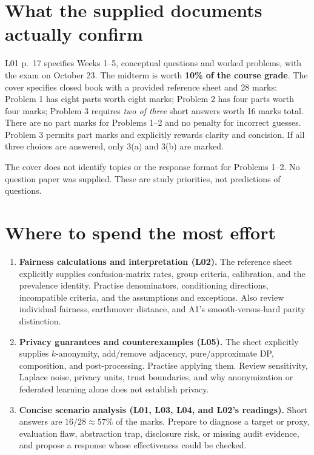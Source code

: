 \documentclass[11pt,letterpaper]{article}
\begin{document}

\section*{What the supplied documents actually confirm}
L01 p.~17 specifies Weeks 1--5, conceptual questions and worked problems, with
the exam on October 23. The midterm is worth \textbf{10\% of the course grade}.
The cover specifies closed book with a provided reference sheet and 28 marks:
Problem 1 has eight parts worth eight marks; Problem 2 has four parts worth four
marks; Problem 3 requires \emph{two of three} short answers worth 16 marks total.
There are no part marks for Problems 1--2 and no penalty for incorrect guesses.
Problem 3 permits part marks and explicitly rewards clarity and concision.
If all three choices are answered, only 3(a) and 3(b) are marked.

The cover does not identify topics or the response format for Problems 1--2.
No question paper was supplied. These are study priorities, not predictions of questions.

\section*{Where to spend the most effort}
\begin{enumerate}
\item \textbf{Fairness calculations and interpretation (L02).} The reference sheet
explicitly supplies confusion-matrix rates, group criteria, calibration, and the
prevalence identity. Practise denominators, conditioning directions, incompatible
criteria, and the assumptions and exceptions. Also review individual fairness,
earthmover distance, and A1's smooth-versus-hard parity distinction.
\item \textbf{Privacy guarantees and counterexamples (L05).} The sheet explicitly
supplies $k$-anonymity, add/remove adjacency, pure/approximate DP, composition,
and post-processing. Practise applying them. Review sensitivity, Laplace noise,
privacy units, trust boundaries, and why anonymization or federated learning
alone does not establish privacy.
\item \textbf{Concise scenario analysis (L01, L03, L04, and L02's readings).}
Short answers are $16/28\approx57\%$ of the marks. Prepare to diagnose a target
or proxy, evaluation flaw, abstraction trap, disclosure risk, or missing audit
evidence, and propose a response whose effectiveness could be checked.
\end{enumerate}
\end{document}
